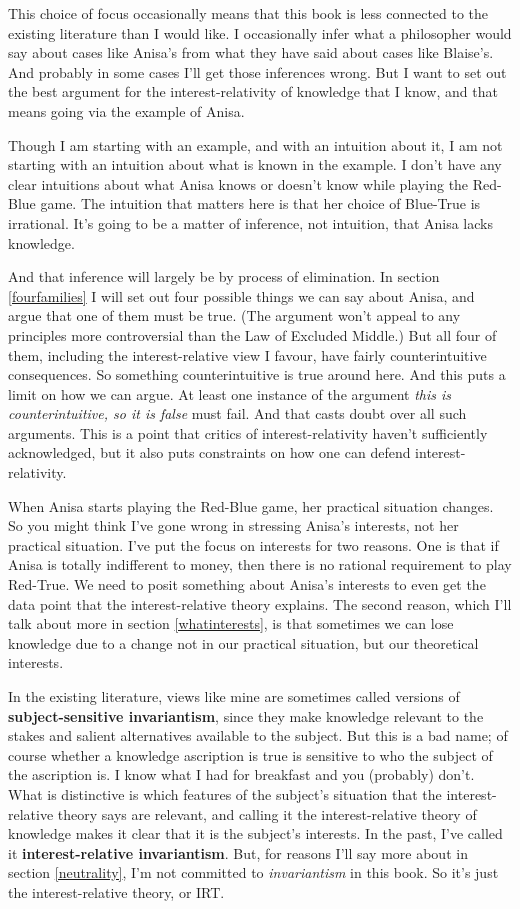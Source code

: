 \documentclass[
  11pt,
]{book}
\begin{document}
This choice of focus occasionally means that this book is less connected to the existing literature than I would like. I occasionally infer what a philosopher would say about cases like Anisa's from what they have said about cases like Blaise's. And probably in some cases I'll get those inferences wrong. But I want to set out the best argument for the interest-relativity of knowledge that I know, and that means going via the example of Anisa.

Though I am starting with an example, and with an intuition about it, I am not starting with an intuition about what is known in the example. I don't have any clear intuitions about what Anisa knows or doesn't know while playing the Red-Blue game. The intuition that matters here is that her choice of Blue-True is irrational. It's going to be a matter of inference, not intuition, that Anisa lacks knowledge.

And that inference will largely be by process of elimination. In section \ref{fourfamilies} I will set out four possible things we can say about Anisa, and argue that one of them must be true. (The argument won't appeal to any principles more controversial than the Law of Excluded Middle.) But all four of them, including the interest-relative view I favour, have fairly counterintuitive consequences. So something counterintuitive is true around here. And this puts a limit on how we can argue. At least one instance of the argument \emph{this is counterintuitive, so it is false} must fail. And that casts doubt over all such arguments. This is a point that critics of interest-relativity haven't sufficiently acknowledged, but it also puts constraints on how one can defend interest-relativity.

When Anisa starts playing the Red-Blue game, her practical situation changes. So you might think I've gone wrong in stressing Anisa's interests, not her practical situation. I've put the focus on interests for two reasons. One is that if Anisa is totally indifferent to money, then there is no rational requirement to play Red-True. We need to posit something about Anisa's interests to even get the data point that the interest-relative theory explains. The second reason, which I'll talk about more in section \ref{whatinterests}, is that sometimes we can lose knowledge due to a change not in our practical situation, but our theoretical interests.

In the existing literature, views like mine are sometimes called versions of \textbf{subject-sensitive invariantism}, since they make knowledge relevant to the stakes and salient alternatives available to the subject. But this is a bad name; of course whether a knowledge ascription is true is sensitive to who the subject of the ascription is. I know what I had for breakfast and you (probably) don't. What is distinctive is which features of the subject's situation that the interest-relative theory says are relevant, and calling it the interest-relative theory of knowledge makes it clear that it is the subject's interests. In the past, I've called it \textbf{interest-relative invariantism}. But, for reasons I'll say more about in section \ref{neutrality}, I'm not committed to \emph{invariantism} in this book. So it's just the interest-relative theory, or IRT.
\end{document}
